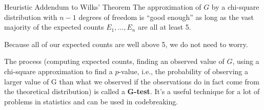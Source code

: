 \documentclass[letterpaper]{article}
\begin{document}
\begin{theorem}{Heuristic Addendum to Wilks' Theorem}{}
    The approximation of $G$ by a chi-square distribution with $n - 1$ degrees of freedom is ``good enough'' as long as the vast majority of the expected counts $E_1, \hdots, E_n$ are all at least 5.
\end{theorem}
Because all of our expected counts are well above 5, we do not need to worry. 

\bigskip 

The process (computing expected counts, finding an observed value of $G$, using a chi-square approximation to find a $p$-value, i.e., the probability of observing a larger value of G than what we observed if the observations do in fact come from the theoretical distribution) is called a \textbf{G-test}. It's a useful technique for a lot of problems in statistics and can be used in codebreaking. 
\end{document}
